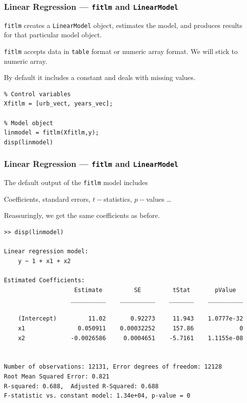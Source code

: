 \documentclass[11pt,xcolor={svgnames},aspectratio=169,usepdftitle=false]{beamer}
\let\toneitemize\itemize
\let\ttwoitemize\enditemize
\renewenvironment{itemize}{\toneitemize\addtolength{\itemsep}{0.7\baselineskip}}{\ttwoitemize}
\begin{document}
\begin{frame}[fragile]
  \frametitle{Linear Regression --- \texttt{fitlm} and \texttt{LinearModel}}
\begin{itemize}
  \item \texttt{fitlm} creates a \texttt{LinearModel} object, estimates the model, and produces results for that particular model object.
  \item \texttt{fitlm} accepts data in \verb;table; format or numeric array format. We will stick to numeric array.
  \item By default it includes a constant and deals with missing values.
\end{itemize}
\begin{lstlisting}
% Control variables
Xfitlm = [urb_vect, years_vec];

% Model object
linmodel = fitlm(Xfitlm,y);
disp(linmodel)
\end{lstlisting}
\end{frame}

\begin{frame}[fragile]
  \frametitle{Linear Regression --- \texttt{fitlm} and \texttt{LinearModel}}
  The default output of the \verb;fitlm; model includes
\begin{itemize}
  \item Coefficients, standard errors, $t-$statistics, $p-$values \ldots
  \item Reassuringly, we get the same coefficients as before.
\end{itemize}
\begin{lstlisting}[basicstyle=\tiny\ttfamily]
>> disp(linmodel)

Linear regression model:
    y ~ 1 + x1 + x2

Estimated Coefficients:
                    Estimate         SE         tStat       pValue  
                   __________    __________    _______    __________

    (Intercept)         11.02       0.92273     11.943    1.0777e-32
    x1               0.050911    0.00032252     157.86             0
    x2             -0.0026586     0.0004651    -5.7161    1.1155e-08


Number of observations: 12131, Error degrees of freedom: 12128
Root Mean Squared Error: 0.821
R-squared: 0.688,  Adjusted R-Squared: 0.688
F-statistic vs. constant model: 1.34e+04, p-value = 0
\end{lstlisting}
\end{frame}
\end{document}
